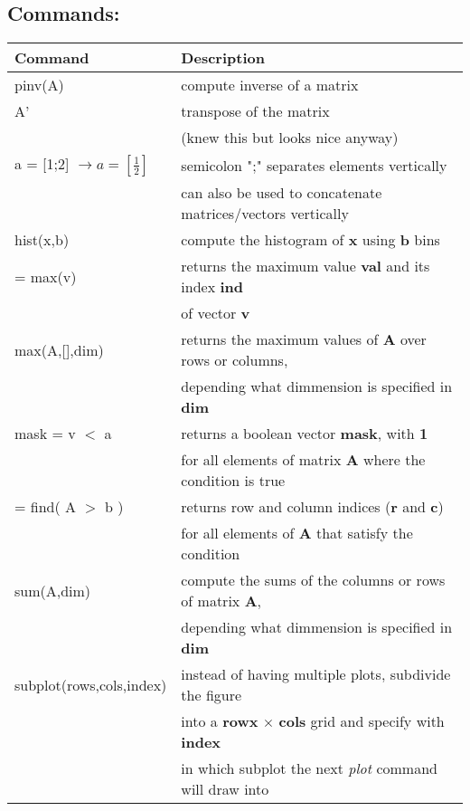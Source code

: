\documentclass[11pt,a4paper]{article}
\begin{document}
\subsection*{Commands:}
\begin{tabular}{l|l}
\textbf{Command}&\textbf{Description}\\
\hline
pinv(A)&compute inverse of a matrix\\
\hline
A'&transpose of the matrix\\
&(knew this but looks nice anyway)\\
\hline
a = [1;2] $\rightarrow a=[\frac{1}{2}]$& semicolon ";" separates elements vertically\\
&can also be used to concatenate matrices/vectors vertically\\
\hline
hist(x,b)&compute the histogram of \textbf{x} using \textbf{b} bins\\
\hline
[val,ind] = max(v)& returns the maximum value \textbf{val} and its index \textbf{ind}\\
&of vector \textbf{v}\\
\hline
max(A,[],dim)& returns the maximum values of \textbf{A} over rows or columns,\\
& depending what dimmension is specified in \textbf{dim}\\
\hline
mask = v $<$ a& returns a boolean vector \textbf{mask}, with \textbf{1}\\
& for all elements of matrix \textbf{A} where the condition is true\\
\hline
[r,c] = find( A $>$ b )& returns row and column indices (\textbf{r} and \textbf{c})\\
& for all elements of \textbf{A} that satisfy the condition\\
\hline
sum(A,dim)& compute the sums of the columns or rows of matrix \textbf{A},\\
& depending what dimmension is specified in \textbf{dim}\\
\hline
subplot(rows,cols,index)& instead of having multiple plots, subdivide the figure\\
&into a \textbf{rowx} $\times$ \textbf{cols} grid and specify with \textbf{index}\\
& in which subplot the next \emph{plot} command will draw into\\
\hline
\end{tabular}
\end{document}
